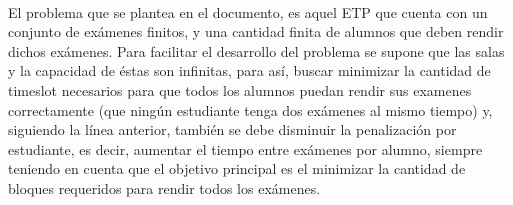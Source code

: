 \begin{itemize}
\end{itemize}
\\
El problema que se plantea en
 el documento, es aquel ETP que cuenta con un conjunto de exámenes finitos, y una cantidad finita de alumnos que deben rendir dichos exámenes. Para facilitar el desarrollo del problema se supone que las salas y la capacidad de éstas son infinitas, para así, buscar minimizar la cantidad de timeslot necesarios para que todos los alumnos puedan rendir sus examenes correctamente (que ningún estudiante tenga dos exámenes al mismo tiempo) y, siguiendo la línea anterior, también se debe disminuir la penalización por estudiante, es decir, aumentar el tiempo entre exámenes por alumno, siempre teniendo en cuenta que el objetivo principal es el minimizar la cantidad de bloques requeridos para rendir todos los exámenes.

